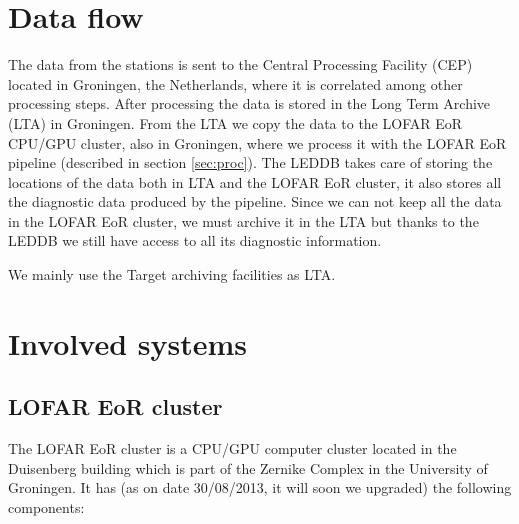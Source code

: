 \documentclass[a4paper,11pt]{article}
\begin{document}
\section{Data flow}
The data from the stations is sent to the Central Processing Facility (CEP) located in Groningen, the Netherlands, where it is correlated among other processing steps. After processing the data is stored in the Long Term Archive (LTA) in Groningen. From the LTA we copy the data to the LOFAR EoR CPU/GPU cluster, also in Groningen, where we process it with the LOFAR EoR pipeline (described in section \ref{sec:proc}). The LEDDB takes care of storing the locations of the data both in LTA and the LOFAR EoR cluster, it also stores all the diagnostic data produced by the pipeline. Since we can not keep all the data in the LOFAR EoR cluster, we must archive it in the LTA but thanks to the LEDDB we still have access to all its diagnostic information.

We mainly use the Target archiving facilities as LTA.

\section{Involved systems}

\subsection{LOFAR EoR cluster}

The LOFAR EoR cluster is a CPU/GPU computer cluster located in the Duisenberg building which is part of the Zernike Complex in the University of Groningen. It has (as on date 30/08/2013, it will soon we upgraded) the following components:
\end{document}
